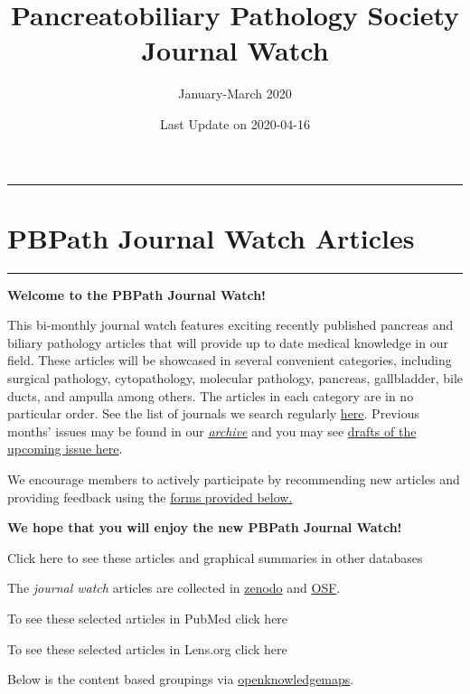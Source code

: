 \documentclass[
]{article}
\title{Pancreatobiliary Pathology Society Journal Watch}
\subtitle{January-March 2020}
\author{}
\date{\vspace{-2.5em}Last Update on 2020-04-16}
\begin{document}
\maketitle

{
\setcounter{tocdepth}{2}
\tableofcontents
}
\begin{center}\rule{0.5\linewidth}{0.5pt}\end{center}

\hypertarget{pbpath_jw}{%
\section{PBPath Journal Watch Articles}\label{pbpath_jw}}

\begin{center}\rule{0.5\linewidth}{0.5pt}\end{center}

\textbf{Welcome to the PBPath Journal Watch!}

This bi-monthly journal watch features exciting recently published
pancreas and biliary pathology articles that will provide up to date
medical knowledge in our field. These articles will be showcased in
several convenient categories, including surgical pathology,
cytopathology, molecular pathology, pancreas, gallbladder, bile ducts,
and ampulla among others. The articles in each category are in no
particular order. See the list of journals we search regularly
\href{http://pbpath.org/pbpath-journal-watch/}{here}. Previous months'
issues may be found in our
\emph{\href{http://pbpath.org/journal-watch-archive/}{archive}} and you
may see \href{http://pbpath.org/journal-watch-upcoming-issue/}{drafts of
the upcoming issue here}.

We encourage members to actively participate by recommending new
articles and providing feedback using the
\protect\hyperlink{feedback}{forms provided below.}

\textbf{We hope that you will enjoy the new PBPath Journal Watch!}

Click here to see these articles and graphical summaries in other
databases

The \emph{journal watch} articles are collected in
\href{https://doi.org/10.5281/zenodo.3635440}{zenodo} and
\href{https://osf.io/3d67y/}{OSF}.

To see these selected articles in PubMed click here

To see these selected articles in Lens.org click here

Below is the content based groupings via
\href{https://openknowledgemaps.org/map/69587f66f7536830fe8dafa88c1f521b}{openknowledgemaps}.
\end{document}
